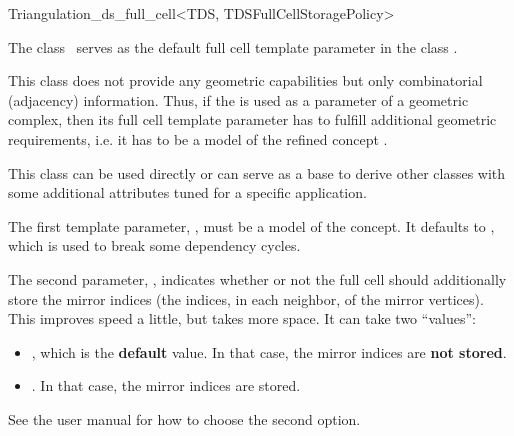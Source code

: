 \begin{ccRefClass}{Triangulation_ds_full_cell<TDS, TDSFullCellStoragePolicy>}

\ccDefinition

The class \ccRefName\ serves as the default full cell template parameter in the
class .

This class does not provide any geometric capabilities but only combinatorial
(adjacency) information. Thus, if the  is
used as a parameter of a geometric complex, then its full cell template
parameter has to fulfill additional geometric requirements, i.e. it has to be
a model of the refined concept .

This class can be used directly or can serve as a base to derive other classes
with some additional attributes tuned for a specific application.


\ccParameters

The first template parameter, , must be a model of the
 concept. It defaults to , which is
used to break some dependency cycles.

The second parameter, , indicates whether or not
the full cell should additionally store the mirror indices (the indices, in each
neighbor, of the mirror vertices). This improves speed a little, but takes
more space. It can take two ``values'':\begin{itemize}

\item {}, which is the \textbf{default}
value. In that case, the mirror indices are \textbf{not stored}.

\item {}. In that case, the mirror
indices are stored.
\end{itemize}
 See the user manual  for how to choose the second option.

\ccIsModel


\ccSeeAlso


\end{ccRefClass}
